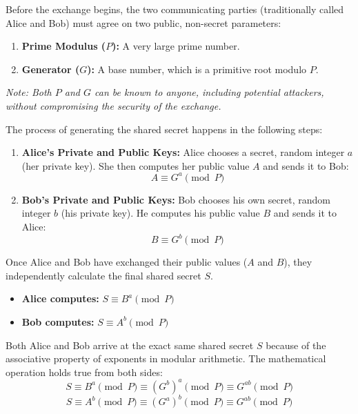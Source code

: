 Before the exchange begins, the two communicating parties (traditionally called Alice and Bob) must agree on two public, non-secret parameters:
\begin{enumerate}
    \item \textbf{Prime Modulus ($P$):} A very large prime number.
    \item \textbf{Generator ($G$):} A base number, which is a primitive root modulo $P$.
\end{enumerate}
\noindent \textit{Note: Both $P$ and $G$ can be known to anyone, including potential attackers, without compromising the security of the exchange.}

The process of generating the shared secret happens in the following steps:
\begin{enumerate}
    \item \textbf{Alice's Private and Public Keys:}
    Alice chooses a secret, random integer $a$ (her private key). She then computes her public value $A$ and sends it to Bob:
    \[
    A \equiv G^a \pmod{P}
    \]

    \item \textbf{Bob's Private and Public Keys:}
    Bob chooses his own secret, random integer $b$ (his private key). He computes his public value $B$ and sends it to Alice:
    \[
    B \equiv G^b \pmod{P}
    \]
\end{enumerate}

Once Alice and Bob have exchanged their public values ($A$ and $B$), they independently calculate the final shared secret $S$.
\begin{itemize}
    \item \textbf{Alice computes:} $S \equiv B^a \pmod{P}$
    \item \textbf{Bob computes:} $S \equiv A^b \pmod{P}$
\end{itemize}

Both Alice and Bob arrive at the exact same shared secret $S$ because of the associative property of exponents in modular arithmetic. The mathematical operation holds true from both sides:
\[
S \equiv B^a \pmod{P} \equiv (G^b)^a \pmod{P} \equiv G^{ab} \pmod{P}
\]
\[
S \equiv A^b \pmod{P} \equiv (G^a)^b \pmod{P} \equiv G^{ab} \pmod{P}
\]


